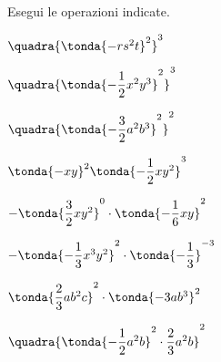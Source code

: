 \begin{esercizio}
\label{ese:9.19}
Esegui le operazioni indicate.
\begin{htmulticols}{2}
\begin{enumeratea}
\spazielenx
\item \(\quadra{\tonda{-rs^{2}t}^{2}}^{3}\)
\item \(\quadra{\tonda{-{\dfrac{1}{2}}x^{2}y^{3}}^{2}}^{3}\)
\item \(\quadra{\tonda{-{\dfrac{3}{2}}a^{2}b^{3}}^{2}}^{2}\)
\item \(\tonda{-xy}^{2}\tonda{-{\dfrac{1}{2}}xy^{2}}^{3}\)
\item 
\(-\tonda{\dfrac{3}{2}xy^{2}}^{0}\cdot\tonda{-{\dfrac{1}{6}}xy}^{2}\)
\item 
\(-\tonda{-{\dfrac{1}{3}}x^{3}y^{2}}^{2}\cdot \tonda{-\dfrac{1}{3}}^{-3}\)
\item \(\tonda{\dfrac{2}{3}ab^{2}c}^{2}\cdot\tonda{-3ab^{3}}^{2}\)
\item 
\(\quadra{\tonda{-{\dfrac{1}{2}}a^{2}b}^{2}\cdot{\dfrac{2}{3}a^{2}b}}^
{ 2}\)
\end{enumeratea}
\end{htmulticols}
\end{esercizio}


